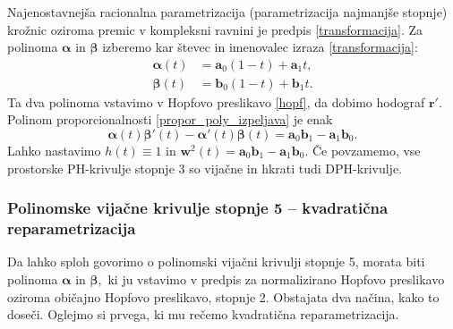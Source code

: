 \documentclass[12pt,a4paper,twoside]{article}
\theoremstyle{definition} %
\theoremstyle{plain} %
\theoremstyle{primerstyle}
\numberwithin{equation}{section}  %
\newcommand{\aV}{\mathbf{a}}
\newcommand{\bV}{\mathbf{b}}
\newcommand{\rV}{\mathbf{r}}
\newcommand{\wV}{\mathbf{w}}
\newcommand{\balpha}{\boldsymbol \alpha}
\newcommand{\bbeta}{\boldsymbol \beta}
\begin{document}
Najenostavnejša racionalna parametrizacija (parametrizacija najmanjše stopnje)\\krožnic oziroma premic v kompleksni ravnini je predpis \eqref{transformacija}. Za polinoma $\balpha$ in $\bbeta$ izberemo kar števec in imenovalec izraza \eqref{transformacija}:
\begin{align*}
	\balpha(t)&=\aV_0(1-t)+\aV_1t,\\
	\bbeta(t)&=\bV_0(1-t)+\bV_1t.
\end{align*}
Ta dva polinoma vstavimo v Hopfovo preslikavo \eqref{hopf}, da dobimo hodograf $\rV'.$ Polinom proporcionalnosti \eqref{propor_poly_izpeljava} je enak
\begin{equation*}
	\balpha(t)\bbeta'(t)-\balpha'(t)\bbeta(t)=\aV_0\bV_1-\aV_1\bV_0.
\end{equation*}
Lahko nastavimo $h(t)\equiv1$ in $\wV^2(t)=\aV_0\bV_1-\aV_1\bV_0.$ Če povzamemo, vse prostorske PH-krivulje stopnje 3 so vijačne in hkrati tudi DPH-krivulje. %

\subsubsection{Polinomske vijačne krivulje stopnje 5 -- kvadratična reparametrizacija}
\label{kvadraticna_reparametrizacija_5}

Da lahko sploh govorimo o polinomski vijačni krivulji stopnje 5, morata biti polinoma $\balpha$ in $\bbeta,$ ki ju vstavimo v predpis za normalizirano Hopfovo preslikavo oziroma običajno Hopfovo preslikavo, stopnje 2. Obstajata dva načina, kako to doseči. Oglejmo si prvega, ki mu rečemo kvadratična reparametrizacija.
\end{document}

